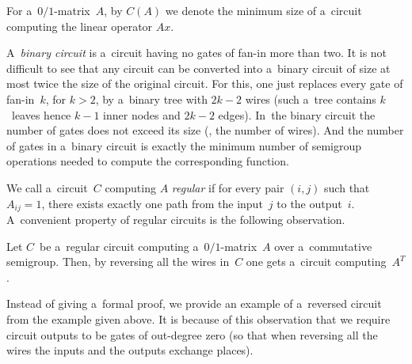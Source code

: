 \documentclass{toc}
\begin{document}
For a~$0/1$-matrix~$A$, by $C(A)$ we denote the minimum size of
a~circuit computing the linear operator $Ax$.


A~\emph{binary circuit} is a~circuit having no gates of fan-in more than two. It
is not difficult to see that any circuit can be converted into a~binary circuit
of size at most twice the size of the original circuit.  For this, one just
replaces every gate of fan-in~$k$, for $k>2$, by a~binary tree with $2k-2$ wires
(such a~tree contains $k$~leaves hence $k-1$ inner nodes and $2k-2$ edges).
In~the binary circuit the number of gates does not exceed its size
(\ie, the number of wires). And the number of gates in a~binary
circuit is exactly the minimum number of semigroup operations needed to
compute the corresponding function.

%
%
%
%
%
%
%
We call a~circuit~$C$ computing $A$ \emph{regular} if for every pair $(i,j)$
such that $A_{ij}=1$, there exists exactly one path from the input~$j$ to the
output~$i$. A~convenient property of regular circuits is the following
observation.

%
%
%
%
\begin{observation}\label{obs:transpose}
Let $C$~be a~regular circuit computing a~$0/1$-matrix~$A$ over a~commutative
semigroup. Then, by reversing all the wires in~$C$ one gets a~circuit
computing~$A^T$.
\end{observation}

Instead of giving a~formal proof, we provide an example of a~reversed circuit
from the example given above. It is because of this observation that we require
circuit outputs to be gates of out-degree zero (so that when reversing all the
wires the inputs and the outputs exchange places).

\begin{center}
\end{center}
\end{document}
